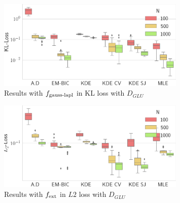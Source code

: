 \begin{figure}
\center
    \includegraphics[width=0.8\textwidth]{./TeX_files/res_lapl_gauss_KL_GLU.png}
    \caption{Results with $f_{\textnormal{gauss-lapl}}$ in KL loss with $D_{GLU}$}
    \label{fig:res_lapl_gauss_KL_GLU}
\end{figure}  
\begin{figure}
\center
    \includegraphics[width=0.8\textwidth]{./TeX_files/res_lapl_gauss_not_dict_L2_GLU.png}
    \caption{Results with $f_{\textnormal{ext}}$ in $L2$ loss with $D_{GLU}$}
    \label{fig:res_ext_L2_GLU}
\end{figure}


